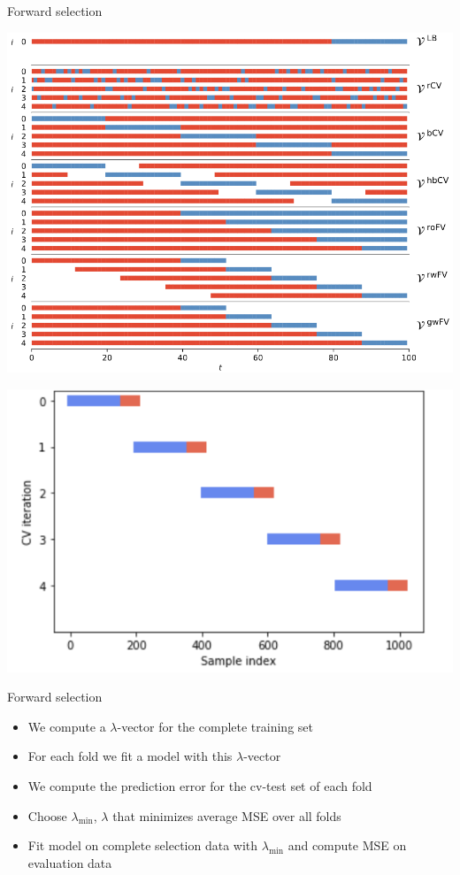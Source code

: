 \documentclass[
  ignorenonframetext,
]{beamer}
\providecommand{\tightlist}{%
  \setlength{\itemsep}{0pt}\setlength{\parskip}{0pt}}
\begin{document}
\begin{frame}{Forward selection}
\protect\hypertarget{forward-selection}{}
\begin{center}\includegraphics[width=0.75\linewidth]{../thesis/validation-schemes} \end{center}

\begin{center}\includegraphics[width=0.75\linewidth]{../thesis/blocked-cv} \end{center}
\end{frame}

\begin{frame}{Forward selection}
\protect\hypertarget{forward-selection-1}{}
\begin{itemize}
\tightlist
\item
  We compute a \(\lambda\)-vector for the complete training set
\item
  For each fold we fit a model with this \(\lambda\)-vector
\item
  We compute the prediction error for the cv-test set of each fold
\item
  Choose \(\lambda_{\min}\), \(\lambda\) that minimizes average MSE over
  all folds
\item
  Fit model on complete selection data with \(\lambda_{\min}\) and
  compute MSE on evaluation data
\end{itemize}
\end{frame}
\end{document}
